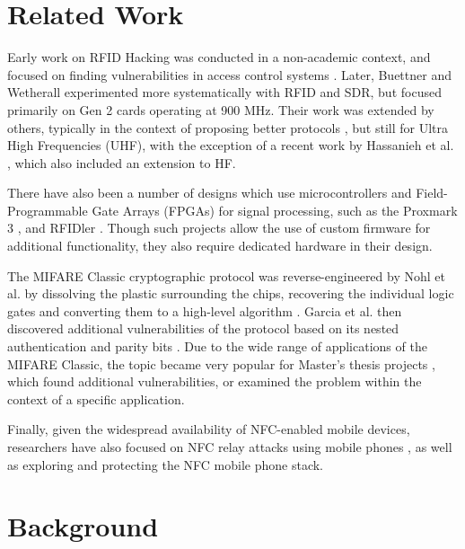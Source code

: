 \documentclass[fleqn,10pt]{SelfArx} %
\begin{document}
\section{Related Work}
\label{sec:related}

Early work on RFID Hacking was conducted in a non-academic context, and focused on finding vulnerabilities in access control systems \cite{ccc, mbta}. Later,  Buettner and Wetherall \cite{sdruhf, gen2usrp, phymac} experimented more systematically with RFID and SDR, but focused primarily on Gen 2 cards operating at 900 MHz. Their work was extended by others, typically in the context of proposing better protocols \cite{gnuradio, zoe}, but still for Ultra High Frequencies (UHF), with the exception of a recent work by Hassanieh et al. \cite{randomization}, which also included an extension to HF.  

There have also been a number of designs which use microcontrollers and Field-Programmable Gate Arrays (FPGAs) for signal processing, such as the Proxmark 3 \cite{proxmark}, and RFIDler \cite{rfidler}. Though such projects allow the use of custom firmware for additional functionality, they also require dedicated hardware in their design.

The MIFARE Classic cryptographic protocol was reverse-engineered by Nohl et al. by dissolving the plastic surrounding the chips, recovering the individual logic gates and converting them to a high-level algorithm \cite{crypto1}. Garcia et al. then discovered additional vulnerabilities of the protocol based on its nested authentication and parity bits \cite{classicvulnerabilities}. Due to the wide range of applications of the MIFARE Classic, the topic became very popular for Master's thesis projects \cite{classicimplementation, chipkaart, classicrng, imperial}, which found additional vulnerabilities, or examined the problem within the context of a specific application.

Finally, given the widespread availability of NFC-enabled mobile devices, researchers have also focused on NFC relay attacks using mobile phones \cite{relay, practicalrelay}, as well as exploring \cite{nfcsurface} and protecting \cite{engarde} the NFC mobile phone stack. 




\section{Background}
\label{sec:background}
\end{document}
